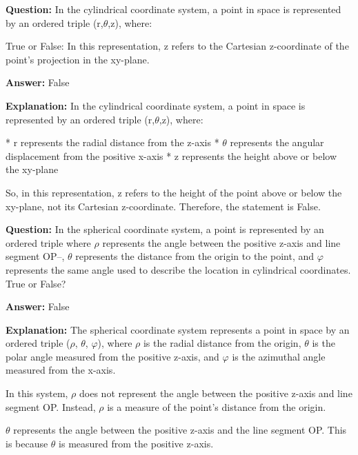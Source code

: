 \documentclass{article}
\begin{document}
            
                \textbf {Question:} In the cylindrical coordinate system, a point in space is represented by an ordered triple (r,\ensuremath{\theta},z), where:

True or False: In this representation, z refers to the Cartesian z-coordinate of the point's projection in the xy-plane.
                
                \textbf{Answer:} False

                \textbf{Explanation:} In the cylindrical coordinate system, a point in space is represented by an ordered triple (r,\ensuremath{\theta},z), where:

* r represents the radial distance from the z-axis
* \ensuremath{\theta} represents the angular displacement from the positive x-axis
* z represents the height above or below the xy-plane

So, in this representation, z refers to the height of the point above or below the xy-plane, not its Cartesian z-coordinate. Therefore, the statement is False.
                
                \vspace{0.5cm} 
        
            
                \textbf {Question:} In the spherical coordinate system, a point is represented by an ordered triple where \ensuremath{\rho} represents the angle between the positive z-axis and line segment OP--, \ensuremath{\theta} represents the distance from the origin to the point, and \ensuremath{\varphi} represents the same angle used to describe the location in cylindrical coordinates. True or False?
                
                \textbf{Answer:} False

                \textbf{Explanation:} The spherical coordinate system represents a point in space by an ordered triple (\ensuremath{\rho}, \ensuremath{\theta}, \ensuremath{\varphi}), where \ensuremath{\rho} is the radial distance from the origin, \ensuremath{\theta} is the polar angle measured from the positive z-axis, and \ensuremath{\varphi} is the azimuthal angle measured from the x-axis. 

In this system, \ensuremath{\rho} does not represent the angle between the positive z-axis and line segment OP. Instead, \ensuremath{\rho} is a measure of the point's distance from the origin. 

\ensuremath{\theta} represents the angle between the positive z-axis and the line segment OP. This is because \ensuremath{\theta} is measured from the positive z-axis.
\end{document}
